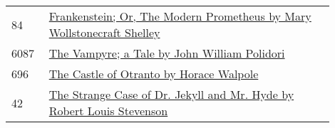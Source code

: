\documentclass[a4paper]{article}
\begin{document}
\begin{multicols}{3}
    \begin{tabular}{L{0.1\linewidth}|R{0.8\linewidth}}\scriptsize
        84   & \href{http://www.gutenberg.org/ebooks/84}{Frankenstein; Or, The Modern Prometheus by Mary Wollstonecraft Shelley} \\
        6087 & \href{https://www.gutenberg.org/ebooks/6087}{The Vampyre; a Tale by John William Polidori}                        \\
        696  & \href{https://www.gutenberg.org/ebooks/696}{The Castle of Otranto by Horace Walpole}                              \\
        42   & \href{https://www.gutenberg.org/ebooks/42}{The Strange Case of Dr. Jekyll and Mr. Hyde by Robert Louis Stevenson}
    \end{tabular}

\end{multicols}



\end{document}
